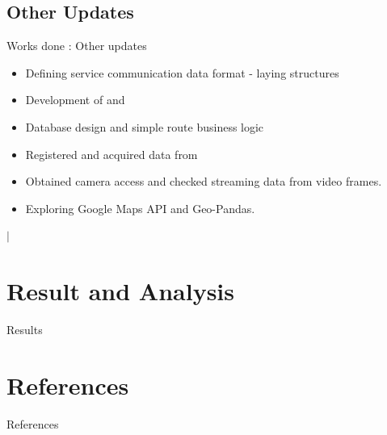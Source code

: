 \documentclass{beamer}
\newcommand{\link}[2]{\href{#1}{\textit{\color{blue}{#2}}}}%
\begin{document}
	\subsection{Other Updates}
	\begin{frame}{Works done : Other updates}
		\begin{itemize}
			\item Defining service communication data format - laying structures \link{https://github.com/Project-Dragon-Fly/mock-servers/blob/main/data\_format.md}{visit here}
			\item Development of \link{https://github.com/Project-Dragon-Fly/backend-server}{backend service} and \link{https://github.com/Project-Dragon-Fly/mock-servers}{mock servers}
			\item Database design and simple route business logic 
			\item Registered and acquired data from \link{https://www.aicitychallenge.org/}{NVIDIA AI City Challenge}
			\item Obtained camera access and checked streaming data from video frames.
			\item Exploring Google Maps API and Geo-Pandas.
		\end{itemize}
		\begin{center}
			\link{https://github.com/Project-Dragon-Fly}{GitHub Organization} $|$ \link{https://drive.google.
				com/drive/folders/1GbQ1L1mfY97nh3NXE4Iyz\_e2gIwvmH0V?usp=sharing}{Shared Google Drive}
		\end{center}
	\end{frame}

	\section{Result and Analysis}
	\begin{frame}{Results}
		
	\end{frame}


\section{References}
\begin{frame}{References}
	\nocite{*}
	
	
\end{frame}
\end{document}
